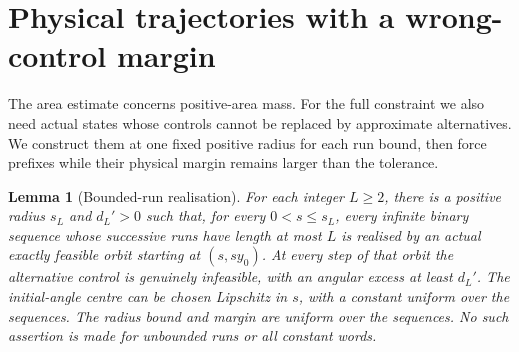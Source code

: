\documentclass[11pt]{amsart}
\newtheorem{lemma}[theorem]{Lemma}
\theoremstyle{definition}
\theoremstyle{remark}
\numberwithin{equation}{section}
\begin{document}
\section{Physical trajectories with a wrong-control margin}\label{sec:shadow}
The area estimate concerns positive-area mass. For the full constraint
we also need actual states whose controls cannot be replaced by
approximate alternatives. We construct them at one fixed positive
radius for each run bound, then force prefixes while their physical
margin remains larger than the tolerance.

\begin{lemma}[Bounded-run realisation]\label{lem:shadow}
For each integer \(L\ge2\), there is a positive radius \(s_L\)
and \(d_L'>0\) such that, for every \(0<s\le s_L\), every
infinite binary sequence whose successive runs have length at most
\(L\) is realised by an actual exactly feasible orbit starting at
\((s,sy_0)\).
At every step of that orbit the alternative control is genuinely
infeasible, with an angular excess at least \(d_L'\).
The initial-angle centre can be chosen Lipschitz in \(s\), with a
constant uniform over the sequences. The radius bound and margin are
uniform over the sequences. No such
assertion is made for unbounded runs or all constant words.

\end{lemma}
\end{document}
